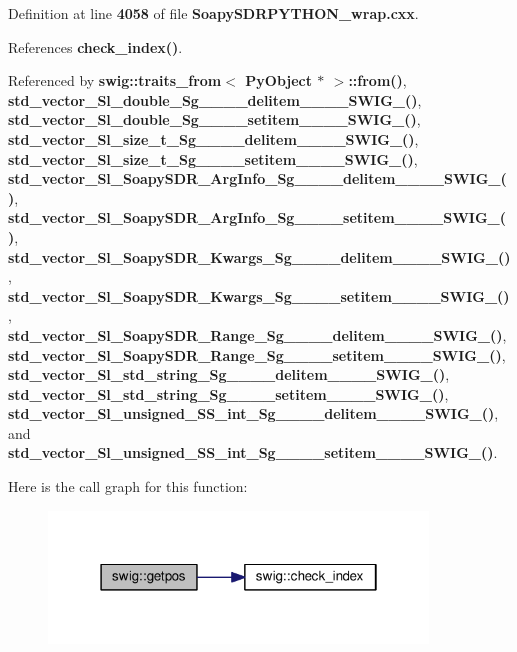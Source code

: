 Definition at line {\bf 4058} of file {\bf Soapy\+S\+D\+R\+P\+Y\+T\+H\+O\+N\+\_\+wrap.\+cxx}.



References {\bf check\+\_\+index()}.



Referenced by {\bf swig\+::traits\+\_\+from$<$ Py\+Object $\ast$ $>$\+::from()}, {\bf std\+\_\+vector\+\_\+\+Sl\+\_\+double\+\_\+\+Sg\+\_\+\+\_\+\+\_\+\+\_\+delitem\+\_\+\+\_\+\+\_\+\+\_\+\+S\+W\+I\+G\+\_()}, {\bf std\+\_\+vector\+\_\+\+Sl\+\_\+double\+\_\+\+Sg\+\_\+\+\_\+\+\_\+\+\_\+setitem\+\_\+\+\_\+\+\_\+\+\_\+\+S\+W\+I\+G\+\_()}, {\bf std\+\_\+vector\+\_\+\+Sl\+\_\+size\+\_\+t\+\_\+\+Sg\+\_\+\+\_\+\+\_\+\+\_\+delitem\+\_\+\+\_\+\+\_\+\+\_\+\+S\+W\+I\+G\+\_()}, {\bf std\+\_\+vector\+\_\+\+Sl\+\_\+size\+\_\+t\+\_\+\+Sg\+\_\+\+\_\+\+\_\+\+\_\+setitem\+\_\+\+\_\+\+\_\+\+\_\+\+S\+W\+I\+G\+\_()}, {\bf std\+\_\+vector\+\_\+\+Sl\+\_\+\+Soapy\+S\+D\+R\+\_\+\+Arg\+Info\+\_\+\+Sg\+\_\+\+\_\+\+\_\+\+\_\+delitem\+\_\+\+\_\+\+\_\+\+\_\+\+S\+W\+I\+G\+\_()}, {\bf std\+\_\+vector\+\_\+\+Sl\+\_\+\+Soapy\+S\+D\+R\+\_\+\+Arg\+Info\+\_\+\+Sg\+\_\+\+\_\+\+\_\+\+\_\+setitem\+\_\+\+\_\+\+\_\+\+\_\+\+S\+W\+I\+G\+\_()}, {\bf std\+\_\+vector\+\_\+\+Sl\+\_\+\+Soapy\+S\+D\+R\+\_\+\+Kwargs\+\_\+\+Sg\+\_\+\+\_\+\+\_\+\+\_\+delitem\+\_\+\+\_\+\+\_\+\+\_\+\+S\+W\+I\+G\+\_()}, {\bf std\+\_\+vector\+\_\+\+Sl\+\_\+\+Soapy\+S\+D\+R\+\_\+\+Kwargs\+\_\+\+Sg\+\_\+\+\_\+\+\_\+\+\_\+setitem\+\_\+\+\_\+\+\_\+\+\_\+\+S\+W\+I\+G\+\_()}, {\bf std\+\_\+vector\+\_\+\+Sl\+\_\+\+Soapy\+S\+D\+R\+\_\+\+Range\+\_\+\+Sg\+\_\+\+\_\+\+\_\+\+\_\+delitem\+\_\+\+\_\+\+\_\+\+\_\+\+S\+W\+I\+G\+\_()}, {\bf std\+\_\+vector\+\_\+\+Sl\+\_\+\+Soapy\+S\+D\+R\+\_\+\+Range\+\_\+\+Sg\+\_\+\+\_\+\+\_\+\+\_\+setitem\+\_\+\+\_\+\+\_\+\+\_\+\+S\+W\+I\+G\+\_()}, {\bf std\+\_\+vector\+\_\+\+Sl\+\_\+std\+\_\+string\+\_\+\+Sg\+\_\+\+\_\+\+\_\+\+\_\+delitem\+\_\+\+\_\+\+\_\+\+\_\+\+S\+W\+I\+G\+\_()}, {\bf std\+\_\+vector\+\_\+\+Sl\+\_\+std\+\_\+string\+\_\+\+Sg\+\_\+\+\_\+\+\_\+\+\_\+setitem\+\_\+\+\_\+\+\_\+\+\_\+\+S\+W\+I\+G\+\_()}, {\bf std\+\_\+vector\+\_\+\+Sl\+\_\+unsigned\+\_\+\+S\+S\+\_\+int\+\_\+\+Sg\+\_\+\+\_\+\+\_\+\+\_\+delitem\+\_\+\+\_\+\+\_\+\+\_\+\+S\+W\+I\+G\+\_()}, and {\bf std\+\_\+vector\+\_\+\+Sl\+\_\+unsigned\+\_\+\+S\+S\+\_\+int\+\_\+\+Sg\+\_\+\+\_\+\+\_\+\+\_\+setitem\+\_\+\+\_\+\+\_\+\+\_\+\+S\+W\+I\+G\+\_()}.



Here is the call graph for this function\+:
\nopagebreak
\begin{figure}[H]
\begin{center}
\leavevmode
\includegraphics[width=286pt]{d3/d99/namespaceswig_a9e303b7ffb07262184774567f345a51e_cgraph}
\end{center}
\end{figure}




